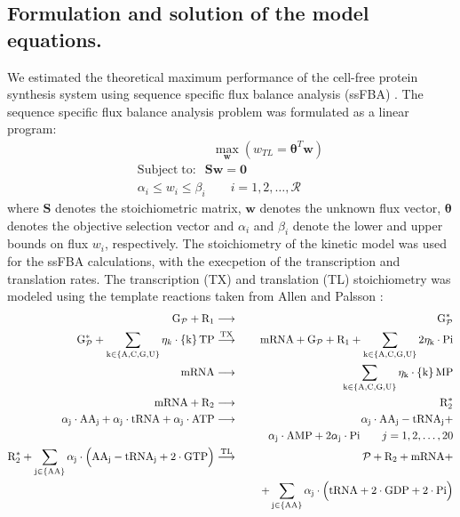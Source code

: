 \documentclass[journal=asbcd6,manuscript=article]{achemso}
\begin{document}
\subsection*{Formulation and solution of the model equations.}
We estimated the theoretical maximum performance of the cell-free protein synthesis system using sequence specific flux balance analysis (ssFBA) \cite{Allen:2003aa}.
The sequence specific flux balance analysis problem was formulated as a linear program:
\begin{equation}
 \begin{multlined}
	\qquad \qquad \qquad \max_{\boldsymbol{w}}{} \! \left( w_{TL} = \mathbf{\boldsymbol{\theta}}^T \boldsymbol{w} \right) \\
	\mathrm{Subject \; to:}
	 \; \; \mathbf{S}\mathbf{w}=\mathbf{0} \\
\alpha_i \leq w_i \leq \beta_i  \qquad i=1,2,\hdots,\mathcal{R}
 \end{multlined}
\end{equation}
where $\mathbf{S}$ denotes the stoichiometric matrix, $\mathbf{w}$ denotes the unknown flux vector, $\boldsymbol{\theta}$ denotes the objective selection vector
and $\alpha_i$ and $\beta_i$ denote the lower and upper bounds on flux $w_{i}$, respectively.
The stoichiometry of the kinetic model was used for the ssFBA calculations, with the execpetion of the transcription and translation rates.
The transcription (TX) and translation (TL) stoichiometry was modeled using the template reactions taken from Allen and Palsson \cite{Allen:2003aa}:
\begin{eqnarray*}
\mathrm{{G}_{\mathcal{P}}}+\mathrm{{R}_{1}} &\longrightarrow& \mathrm{G_{\mathcal{P}}^{*}} \\
\mathrm{G_{\mathcal{P}}^{*}}+\sum_{\mathrm{k\in\left\{A,C,G,U\right\}}}\eta_{k}\cdot \mathrm{\left\{k\right\}TP} &\overset{\rm TX}{\longrightarrow}& \mathrm{mRNA}+\mathrm{G_{\mathcal{P}}}+\mathrm{R_{1}}+ \mathrm{\sum_{k\in\left\{A,C,G,U\right\}}2\eta_{k}\cdot Pi}\\
\mathrm{mRNA} &\longrightarrow& \mathrm{\sum_{k\in\left\{A,C,G,U\right\}}\eta_{k}\cdot \left\{k\right\}MP} \\
\mathrm{mRNA}+\mathrm{R_{2}} &\longrightarrow& \mathrm{R_{2}^{*}} \\
\mathrm{\alpha_{j}\cdot AA_{j}+\alpha_{j}\cdot tRNA+\alpha_{j}\cdot ATP} &\longrightarrow& \mathrm{\alpha_{j}\cdot AA_{j}-tRNA_{j}+}\\
&& \mathrm{\qquad \alpha_{j}\cdot AMP+2\alpha_{j}\cdot Pi} \qquad{j=1,2,\hdots,20}\\
\mathrm{R_{2}^{*}+\sum_{j\in\left\{AA\right\}}\alpha_{j}\cdot \Big(AA_{j}-tRNA_{j}+2\cdot GTP\Big)} &\stackrel{\rm TL}{\longrightarrow}& \mathcal{P}+\mathrm{R_{2}+mRNA}+\\
&& \mathrm{\quad +\sum_{j\in\left\{AA\right\}}\alpha_{j}\cdot\Big(tRNA+2\cdot GDP+2\cdot Pi\Big)}
\end{eqnarray*}
\end{document}
